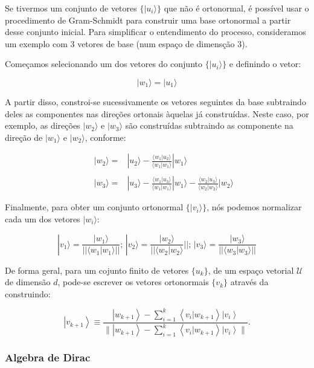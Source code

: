 \documentclass[11pt]{article}
\begin{document}
Se tivermos um conjunto de vetores \(\{ |u_i\rangle \}\) que não é
ortonormal, é possível usar o procedimento de Gram-Schmidt para
construir uma base ortonormal a partir desse conjunto inicial. Para
simplificar o entendimento do processo, consideramos um exemplo com 3
vetores de base (num espaço de dimensção 3).

Começamos selecionando um dos vetores do conjunto \(\{ |u_i\rangle \}\)
e definindo o vetor:

\[ |w_1\rangle = |u_1\rangle  \]

A partir disso, constroi-se sucessivamente os vetores seguintes da base
subtraindo deles as componentes nas direções ortonais àquelas já
construídas. Neste caso, por exemplo, as direções \(|w_2\rangle\) e
\(|w_3\rangle\) são construídas subtraindo as componente na direção de
\(|w_1\rangle\) e \(|w_2\rangle\), conforme:

\[\begin{array}{c}
&&|w_2 \rangle =& |u_2\rangle - \frac{\langle w_1 | u_2 \rangle}{\langle w_1 | w_1 \rangle} |w_1\rangle \\ \\
&&|w_3\rangle =& |u_3\rangle - \frac{\langle w_1 | u_3 \rangle }{\langle w_1 | w_1 \rangle} |w_1\rangle - \frac{\langle w_2 | u_3 \rangle }{\langle w_2 | w_2 \rangle} |w_2\rangle \end{array}\]

Finalmente, para obter um conjunto ortonormal \(\{ |v_i\rangle \}\), nós
podemos normalizar cada um dos vetores \(|w_i\rangle\):

\[|v_1\rangle = \frac{ |w_1 \rangle }{||\langle w_1 | w_1 \rangle||}; \,
|v_2\rangle = \frac{ |w_2 \rangle }{||\langle w_2 | w_2 \rangle}||; \,
|v_3\rangle = \frac{ |w_3 \rangle }{||\langle w_3 | w_3 \rangle||}\]

De forma geral, para um cojunto finito de vetores \(\{u_k\}\), de um
espaço vetorial \(\mathcal{U}\) de dimensão \(d\), pode-se escrever os
vetores ortonormais \(\{v_k\}\) através da construindo:

\[
\left|v_{k+1}\right\rangle \equiv \frac{\left|w_{k+1}\right\rangle-\sum_{i=1}^{k}\left\langle v_{i} | w_{k+1}\right\rangle\left|v_{i}\right\rangle}{\|\left|w_{k+1}\right\rangle-\sum_{i=1}^{k}\left\langle v_{i} | w_{k+1}\right\rangle\left|v_{i}\right\rangle \|}.
\]

    \hypertarget{algebra-de-dirac}{%
\subsubsection{Algebra de Dirac}\label{algebra-de-dirac}}
\end{document}
